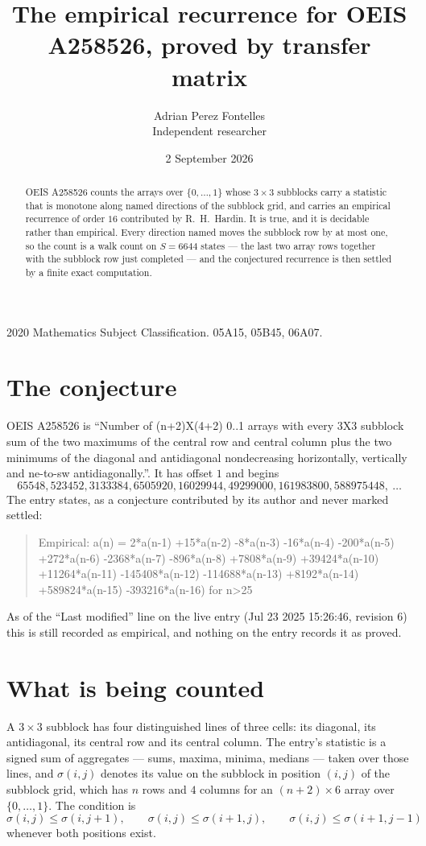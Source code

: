 \documentclass[11pt,a4paper]{article}
\title{The empirical recurrence for OEIS A258526, proved by transfer matrix}
\author{Adrian Perez Fontelles\\ \small Independent researcher}
\date{2 September 2026}
\theoremstyle{plain}
\theoremstyle{definition}
\begin{document}
\maketitle

\begin{abstract}
OEIS A258526 counts the arrays over $\{0,\dots,1\}$ whose $3\times3$ subblocks carry a
statistic that is monotone along named directions of the subblock grid, and carries an
empirical recurrence of order $16$ contributed by R.~H.~Hardin. It is true, and it is
decidable rather than empirical. Every direction named moves the subblock row by at most one,
so the count is a walk count on $S=6644$ states --- the last two array rows together with the
subblock row just completed --- and the conjectured recurrence is then settled by a finite
exact computation.
\end{abstract}

\noindent\small 2020 Mathematics Subject Classification. 05A15, 05B45, 06A07.\normalsize

\section{The conjecture}

OEIS A258526 is ``Number of (n+2)X(4+2) 0..1 arrays with every 3X3 subblock sum of the two maximums of the central row and central column plus the two minimums of the diagonal and antidiagonal nondecreasing horizontally, vertically and ne-to-sw antidiagonally.''. It has offset $1$ and begins
\[
65548, 523452, 3133384, 6505920, 16029944, 49299000, 161983800, 588975448,\ \dots
\]
The entry states, as a conjecture contributed by its author and never marked settled:
\begin{quote}
Empirical: a(n) = 2*a(n-1) +15*a(n-2) -8*a(n-3) -16*a(n-4) -200*a(n-5) +272*a(n-6) -2368*a(n-7) -896*a(n-8) +7808*a(n-9) +39424*a(n-10) +11264*a(n-11) -145408*a(n-12) -114688*a(n-13) +8192*a(n-14) +589824*a(n-15) -393216*a(n-16) for n>25
\end{quote}
As of the ``Last modified'' line on the live entry (Jul 23 2025 15:26:46, revision 6) this is still
recorded as empirical, and nothing on the entry records it as proved.

\section{What is being counted}

A $3\times3$ subblock has four distinguished lines of three cells: its diagonal, its
antidiagonal, its central row and its central column. The entry's statistic is a signed sum of
aggregates --- sums, maxima, minima, medians --- taken over those lines, and $\sigma(i,j)$
denotes its value on the subblock in position $(i,j)$ of the subblock grid, which has $n$ rows
and $4$ columns for an $(n+2)\times6$ array over $\{0,\dots,1\}$. The condition is
\[
\sigma(i,j)\le\sigma(i,j+1),\qquad \sigma(i,j)\le\sigma(i+1,j),\qquad \sigma(i,j)\le\sigma(i+1,j-1)
\]
whenever both positions exist.
\end{document}

